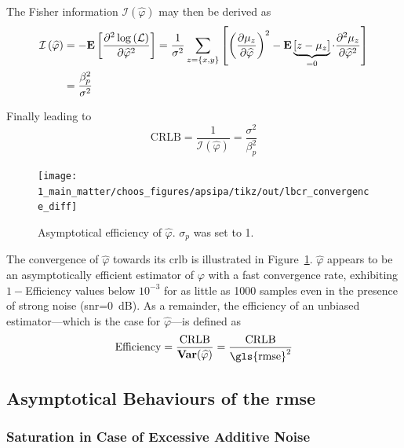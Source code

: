 The Fisher information $\mathcal{I} \left(\widehat{\varphi}\right)$ may then be derived as
\begin{equation}
	\begin{aligned}
		\mathcal{I} \left(\widehat{\varphi}\right) &= - \mathbf{E} \left[ \frac{\partial^2 \log \left(\mathcal{L}\right)}{\partial \widehat{\varphi}^2} \right] = \frac{1}{\sigma^2} \sum_{z=\{x, y\}} \left[ \left(\frac{\partial \mu_z}{\partial \widehat{\varphi}}\right)^2 - \mathbf{E} \underbrace{\left[z - \mu_z\right]}_{=0} \cdot \frac{\partial^2 \mu_z}{\partial \widehat{\varphi}^2} \right] \\
		&= \frac{\beta_p^2}{\sigma^2}
	\end{aligned}
\end{equation}

Finally leading to
\begin{equation}
	\boxed{
		\text{CRLB} = \frac{1}{\mathcal{I} \left(\widehat{\varphi}\right)} = \frac{\sigma^2}{\beta_p^2}
	}
\end{equation}

\begin{figure}
	\centering
	\texttt{[image: 1\_main\_matter/choos\_figures/apsipa/tikz/out/lbcr\_convergence\_diff]}
	\caption{Asymptotical efficiency of $\widehat{\varphi}$. $\sigma_p$ was set to 1{\degree}.}
	\label{fig:choos:apsipa:lbcr_convergence}
\end{figure}

The convergence of $\widehat{\varphi}$ towards its \gls{crlb} is illustrated in Figure~\ref{fig:choos:apsipa:lbcr_convergence}. $\widehat{\varphi}$ appears to be an asymptotically efficient estimator of $\varphi$ with a fast convergence rate, exhibiting $1-$Efficiency values below $10^{-3}$ for as little as 1000 samples even in the presence of strong noise (\gls{snr}=0~dB).  As a remainder, the efficiency of an unbiased estimator---which is the case for $\widehat{\varphi}$---is defined as\cite[p.~279]{hogg2014}
\begin{equation}
	\text{Efficiency} = \frac{\text{CRLB}}{\var{\left(\widehat{\varphi}\right)}} = \frac{\text{CRLB}}{\text{\gls{rmse}}^2}
\end{equation}

\subsection{Asymptotical Behaviours of the \texorpdfstring{\gls{rmse}}{RMSE}}

\subsubsection{Saturation in Case of Excessive Additive Noise}\label{subsect:choos:apsipa:uniform_sat}

